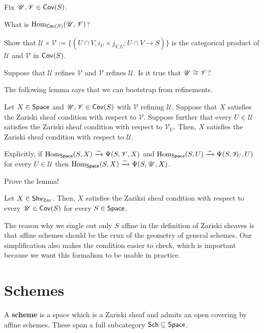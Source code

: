 \documentclass[11pt]{article}
\newcommand{\U}{\mathscr{U}}
\newcommand{\V}{\mathscr{V}}
\begin{document}
\begin{exercise}
Fix $\U,\V\in\Cov(S)$.
\begin{enum}{\alph}
\item What is $\Hom_{\Cov(S)}(\U,\V)$?

\item Show that $\U\times\V:=\{(U\cap V,i_U\times j_{V,U}: U\cap V\to S)\}$ is the categorical product of $\U$ and $\V$ in $\operatorname{\mathsf{Cov}}(S)$.

\item Suppose that $\U$ refines $\V$ and $\V$ refines $\U$. Is it true that $\U\iso\V$?
\end{enum}
\end{exercise}

The following lemma says that we can bootstrap from refinements.

\begin{lemma}
Let $X\in\operatorname{\mathsf{Space}}$ and $\U,\V\in\Cov(S)$ with $\V$ refining $\U$. Suppose that $X$ satisfies the Zariski sheaf condition with respect to $\V$. Suppose further that every $U\in\U$ satisfies the Zariski sheaf condition with respect to $\V_U$. Then, $X$ satisfies the Zariski sheaf condition with respect to $\U$.
\end{lemma}

Explicitly, if $\Hom_{\Space}(S,X)\xto{\sim}\Psi(S,\V,X)$ and $\Hom_{\Space}(S,U)\xto{\sim}\Psi(S,\V_U,U)$ for every $U\in\U$ then $\Hom_{\Space}(S,X)\xto{\sim}\Psi(S,\U,X)$.

\begin{exercise}
Prove the lemma!
\end{exercise}

\begin{corollary}
Let $X\in\operatorname{\mathsf{Shv}}_{\operatorname{Zar}}$. Then, $X$ satisfies the Zariksi sheaf condition with respect to every $\U\in\Cov(S)$ for every $S\in\operatorname{\mathsf{Space}}$.
\end{corollary}

The reason why we single out only $S$ affine in the definition of Zariski sheaves is that affine schemes should be the crux of the geometry of general schemes. Our simplification also makes the condition easier to check, which is important because we want this formalism to be usable in practice.

\section{Schemes}
\begin{definition}
A \textbf{scheme} is a space which is a Zariski sheaf and admits an open covering by affine schemes. These span a full subcategory $\operatorname{\mathsf{Sch}}\subseteq\operatorname{\mathsf{Space}}$.
\end{definition}
\end{document}

